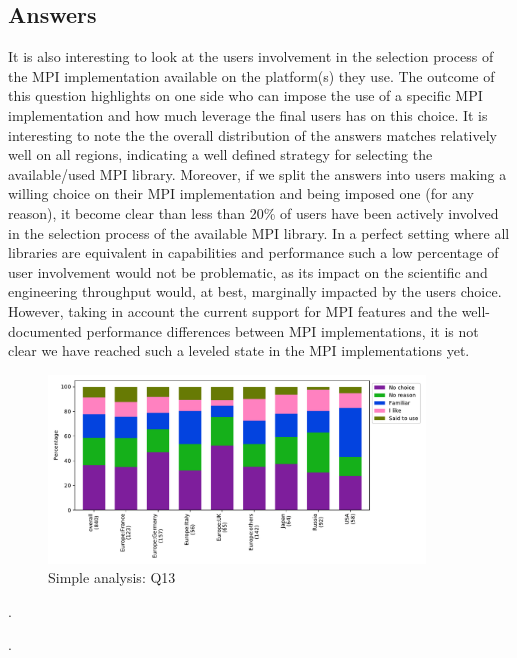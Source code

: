 
\subsection{Answers}


It is also interesting to look at the users involvement in the selection process of the MPI implementation available on the platform(s) they use. The outcome of this question highlights on one side who can impose the use of a specific MPI implementation and how much leverage the final users has on this choice. It is interesting to note the the overall distribution of the answers matches relatively well on all regions, indicating a well defined strategy for selecting the available/used MPI library. Moreover, if we split the answers into users making a willing choice on their MPI implementation and being imposed one (for any reason), it become clear than less than 20\% of users have been actively involved in the selection process of the available MPI library.
%
In a perfect setting where all libraries are equivalent in capabilities and performance such a low percentage of user involvement would not be problematic, as its impact on the scientific and engineering throughput would, at best, marginally impacted by the users choice. However, taking in account the current support for MPI features and the well-documented performance differences between MPI implementations, it is not clear we have reached such a leveled state in the MPI implementations yet.

\begin{figure}[htb]
\begin{center}
\includegraphics[width=10cm]{../pdfs/Q13.pdf}
\caption{Simple analysis: Q13}
\label{fig:Q13}
\end{center}
\end{figure}

.

.
